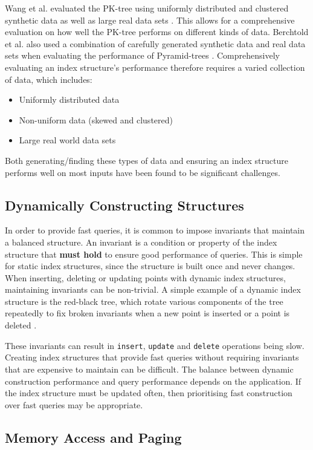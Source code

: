 Wang et al. evaluated the PK-tree using uniformly distributed and clustered synthetic data as well as large real data sets \cite{pk-tree}. This allows for a comprehensive evaluation on how well the PK-tree performs on different kinds of data. Berchtold et al. also used a combination of carefully generated synthetic data and real data sets when evaluating the performance of Pyramid-trees \cite{pyramid-tree}. 
Comprehensively evaluating an index structure's performance therefore requires a varied collection of data, which includes:
\begin{itemize}
	\item Uniformly distributed data
	\item Non-uniform data (skewed and clustered)
	\item Large real world data sets
\end{itemize}	
Both generating/finding these types of data and ensuring an index structure performs well on most inputs have been found to be significant challenges.

\subsection{Dynamically Constructing Structures}

In order to provide fast queries, it is common to impose invariants that maintain a balanced structure. An invariant is a condition or property of the index structure that \textbf{must hold} to ensure good performance of queries. This is simple for static index structures, since the structure is built once and never changes. When inserting, deleting or updating points with dynamic index structures, maintaining invariants can be non-trivial. A simple example of a dynamic index structure is the red-black tree, which rotate various components of the tree repeatedly to fix broken invariants when a new point is inserted or a point is deleted \cite{introduction-to-algorithms}.

These invariants can result in \texttt{insert}, \texttt{update} and \texttt{delete} operations being slow. Creating index structures that provide fast queries without requiring invariants that are expensive to maintain can be difficult. The balance between dynamic construction performance and query performance depends on the application. If the index structure must be updated often, then prioritising fast construction over fast queries may be appropriate.

\subsection{Memory Access and Paging}
\label{sec:paging}

